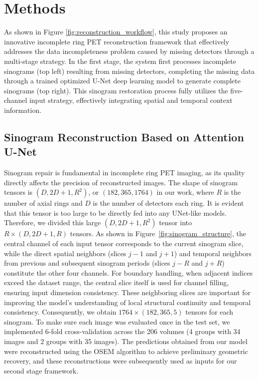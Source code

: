\documentclass[aps,prb,preprint,groupedaddress,showkeys]{revtex4}
\begin{document}
\section{Methods}
\label{chap:methods}


As shown in Figure \ref{fig:reconstruction_workflow}, this study proposes an innovative incomplete ring PET reconstruction framework that effectively addresses the data incompleteness problem caused by missing detectors through a multi-stage strategy. In the first stage, the system first processes incomplete sinograms (top left) resulting from missing detectors, completing the missing data through a trained optimized U-Net deep learning model to generate complete sinograms (top right). This sinogram restoration process fully utilizes the five-channel input strategy, effectively integrating spatial and temporal context information.


\subsection{Sinogram Reconstruction Based on Attention U-Net}
\label{sec:unet_sinogram}

Sinogram repair is fundamental in incomplete ring PET imaging, as its quality directly affects the precision of reconstructed images. 
The shape of sinogram tensors is $(D, 2D+1, R^2)$, or $(182, 365, 1764)$ in our work, where $R$ is the number of axial rings and $D$ is the number of detectors each ring. It is evident that this tensor is too large to be directly fed into any UNet-like models. Therefore, we divided this large $(D, 2D+1, R^2)$ tensor into $R\times(D, 2D+1, R)$ tensors. 
As shown in Figure~\ref{fig:sinogram_structure}, the central channel of each input tensor corresponds to the current sinogram slice, while the direct spatial neighbors (slices $j-1$ and $j+1$) and temporal neighbors from previous and subsequent sinogram periods (slices $j-R$ and $j+R$) constitute the other four channels. For boundary handling, when adjacent indices exceed the dataset range, the central slice itself is used for channel filling, ensuring input dimension consistency. These neighboring slices are important for improving the model's understanding of local structural continuity and temporal consistency. Consequently, we obtain $1764\times(182, 365, 5)$ tensors for each sinogram. 
To make sure each image was evaluated once in the test set, we implemented 6-fold cross-validation across the 206 volumes (4 groups with 34 images and 2 groups with 35 images). The predictions obtained from our model were reconstructed using the OSEM algorithm to achieve preliminary geometric recovery, and these reconstructions were subsequently used as inputs for our second stage framework.
\end{document}
